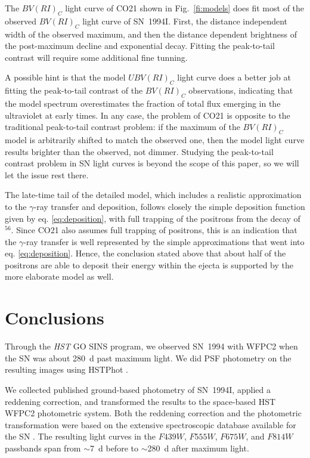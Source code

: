 \documentclass[12pt,manuscript]{aastex}
\begin{document}
The $BV(RI)_C$ light curve of CO21 shown in Fig.~\ref{fi:models}
does fit most of the observed $BV(RI)_C$ light curve of SN~1994I.
%
First, the distance independent width of the observed maximum, and then
the distance dependent brightness of the post-maximum decline and exponential decay.
%
Fitting the peak-to-tail contrast will require some additional fine tunning.

A possible hint is that the model $UBV(RI)_C$ light curve does a better job
at fitting the peak-to-tail contrast of the $BV(RI)_C$ observations, indicating
that the model spectrum overestimates the fraction of total flux emerging in the
ultraviolet at early times.
%
In any case, the problem of CO21 is opposite to the traditional peak-to-tail
contrast problem: if the maximum of the $BV(RI)_C$ model is arbitrarily shifted to match
the observed one, then the model light curve results brighter than the observed,
not dimmer.
%
Studying the peak-to-tail contrast problem in SN light curves is beyond the scope of this
paper, so we will let the issue rest there.

The late-time tail of the detailed model, which includes a 
realistic approximation to the $\gamma$-ray transfer and
deposition, follows closely the simple deposition function 
given by eq. \ref{eq:deposition}, with full trapping of the 
positrons from the decay of $^{56}$.
%
Since CO21 also assumes full trapping of positrons, this is 
an indication that the $\gamma$-ray transfer is well represented
by the simple approximations that went into 
eq. \ref{eq:deposition}.
%
Hence, the conclusion stated above that about half of the 
positrons are able to deposit their energy within the ejecta 
is supported by the more elaborate model as well.


\section{Conclusions} \label{se:conclusions}

Through the {\em HST} GO SINS program, we observed SN~1994 
with WFPC2 when the SN was about 280~d past maximum light.
%
We did PSF photometry on the resulting images using 
HSTPhot \citep{dol00}.


We collected published ground-based photometry of SN~1994I, 
applied a reddening correction, and transformed the results 
to the space-based {HST} WFPC2 photometric system.
%
Both the reddening correction and the photometric transformation 
were based on the extensive spectroscopic database available
for the SN \citep{fetal95, cetal96b}.
%
The resulting light curves in the $F439W$, $F555W$, $F675W$, 
and $F814W$ passbands span from $\sim$7~d before to $\sim$280~d
after maximum light.
\end{document}
